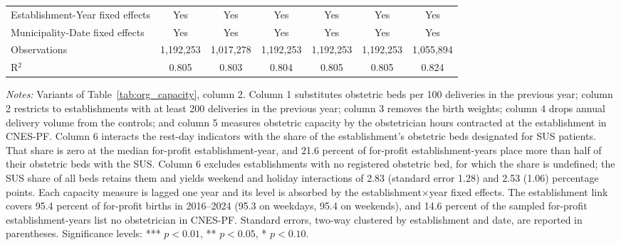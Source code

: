 \begin{table}
{\begin{tabular}{lcccccc}
\addlinespace[2pt]
      \midrule
      Establishment-Year fixed effects & Yes                     & Yes                & Yes        & Yes              & Yes              & Yes\\  
      Municipality-Date fixed effects & Yes                     & Yes                & Yes        & Yes              & Yes              & Yes\\  
      \midrule
      Observations                                                      & 1,192,253               & 1,017,278          & 1,192,253  & 1,192,253        & 1,192,253        & 1,055,894\\  
      R$^2$                                                             & 0.805                   & 0.803              & 0.804      & 0.805            & 0.805            & 0.824\\  
\bottomrule
   \end{tabular}
}
\begin{minipage}{\linewidth}\footnotesize
\textit{Notes:} Variants of Table~\ref{tab:org_capacity}, column 2. Column 1 substitutes obstetric beds per 100 deliveries in the previous year; column 2 restricts to establishments with at least 200 deliveries in the previous year; column 3 removes the birth weights; column 4 drops annual delivery volume from the controls; and column 5 measures obstetric capacity by the obstetrician hours contracted at the establishment in CNES-PF. Column 6 interacts the rest-day indicators with the share of the establishment's obstetric beds designated for SUS patients. That share is zero at the median for-profit establishment-year, and 21.6 percent of for-profit establishment-years place more than half of their obstetric beds with the SUS. Column 6 excludes establishments with no registered obstetric bed, for which the share is undefined; the SUS share of all beds retains them and yields weekend and holiday interactions of 2.83 (standard error 1.28) and 2.53 (1.06) percentage points. Each capacity measure is lagged one year and its level is absorbed by the establishment$\times$year fixed effects. The establishment link covers 95.4 percent of for-profit births in 2016--2024 (95.3 on weekdays, 95.4 on weekends), and 14.6 percent of the sampled for-profit establishment-years list no obstetrician in CNES-PF. Standard errors, two-way clustered by establishment and date, are reported in parentheses.
\newline
\footnotesize Significance levels: *** $p<0.01$, ** $p<0.05$, * $p<0.10$.
\end{minipage}
\end{table}


